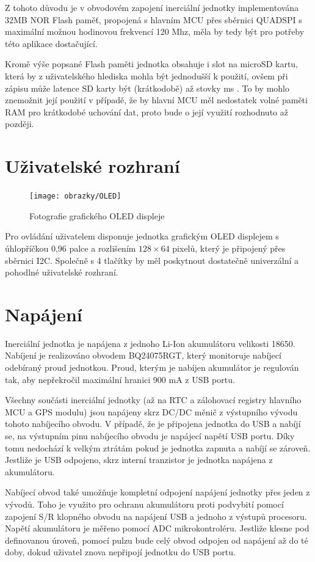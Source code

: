 Z tohoto důvodu je v obvodovém zapojení inerciální jednotky implementována 32MB NOR Flash paměť, propojená s hlavním MCU přes sběrnici QUADSPI s maximální možnou hodinovou frekvencí 120 Mhz, měla by tedy být pro potřeby této aplikace dostačující. \cite{CgaRYSTpwKhEZZr7}

Kromě výše popsané Flash paměti jednotka obsahuje i slot na microSD kartu, která by z uživatelského hlediska mohla být jednodušší k použití, ovšem při zápisu může latence SD karty být (krátkodobě) až stovky ms \cite{Kraewinkel2020}. To by mohlo znemožnit její použití v případě, že by hlavní MCU měl nedostatek volné paměti RAM pro krátkodobé uchování dat, proto bude o její využití rozhodnuto až později.

\section{Uživatelské rozhraní}
\begin{figure}[h]
    \centering
    \texttt{[image: obrazky/OLED]}
    \caption{Fotografie grafického OLED displeje}
\end{figure}
Pro ovládání uživatelem disponuje jednotka grafickým OLED displejem s úhlopříčkou 0,96 palce a rozlišením $ 128 \times 64 $ pixelů, který je připojený přes sběrnici I2C. Společně s 4 tlačítky by měl poskytnout dostatečně univerzální a pohodlné uživatelské rozhraní.

\section{Napájení}
Inerciální jednotka je napájena z jednoho Li-Ion akumulátoru velikosti 18650. Nabíjení je realizováno obvodem BQ24075RGT, který monitoruje nabíjecí odebíraný proud jednotkou. Proud, kterým je nabíjen akumulátor je regulován tak, aby nepřekročil maximální hranici 900 mA z USB portu. \cite{F5eZCtr2LLRsr9NT}

Všechny součásti inerciální jednotky (až na RTC a zálohovací registry hlavního MCU a GPS modulu) jsou napájeny skrz DC/DC měnič z výstupního vývodu tohoto nabíjecího obvodu. V případě, že je připojena jednotka do USB a nabíjí se, na výstupním pinu nabíjecího obvodu je napájecí napětí USB portu. Díky tomu nedochází k velkým ztrátám pokud je jednotka zapnuta a nabíjí se zároveň. Jestliže je USB odpojeno, skrz interní tranzistor je jednotka napájena z akumulátoru. \cite{F5eZCtr2LLRsr9NT}

Nabíjecí obvod také umožňuje kompletní odpojení napájení jednotky přes jeden z vývodů. Toho je využito pro ochranu akumulátoru proti podvybití pomocí zapojení S/R klopného obvodu na napájení USB a jednoho z výstupů procesoru. Napětí akumulátoru je měřeno pomocí ADC mikrokontroléru. Jestliže klesne pod definovanou úroveň, pomocí pulzu bude celý obvod odpojen od napájení až do té doby, dokud uživatel znova nepřipojí jednotku do USB portu.

